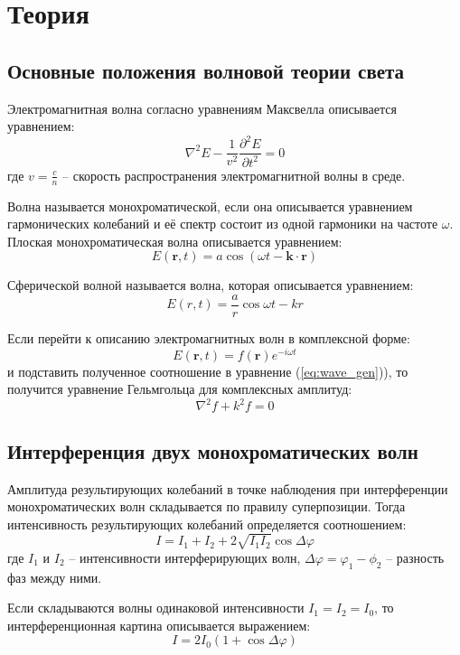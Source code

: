 \section*{Теория}

\subsection*{Основные положения волновой теории света}

Электромагнитная волна согласно уравнениям Максвелла описывается уравнением:
\begin{equation}
\nabla^2 E - \frac{1}{v^2} \frac{\partial^2 E}{\partial t^2} = 0
\label{eq:wave_gen}
\end{equation}
где $v = \frac{c}{n}$ -- скорость распространения электромагнитной волны в 
среде.

Волна называется монохроматической, если она описывается уравнением 
гармонических колебаний и её спектр состоит из одной гармоники на частоте 
$\omega$. Плоская монохроматическая волна описывается уравнением:
$$
E(\boldsymbol{r}, t) = a \cos \left( \omega t - \boldsymbol{k} \cdot 
\boldsymbol{r} \right)
$$

Сферической волной называется волна, которая описывается уравнением:
$$
E(r, t) = \frac{a}{r} \cos{\omega t - k r}
$$

Если перейти к описанию электромагнитных волн в комплексной форме:
$$
E(\boldsymbol{r}, t) = f(\boldsymbol{r}) e^{-i \omega t}
$$
и подставить полученное соотношение в уравнение (\ref{eq:wave_gen})), то 
получится уравнение Гельмгольца для комплексных амплитуд:
$$
\nabla^2 f + k^2 f = 0
$$

\subsection*{Интерференция двух монохроматических волн}

Амплитуда результирующих колебаний в точке наблюдения при интерференции 
монохроматических волн складывается по правилу суперпозиции. Тогда 
интенсивность результирующих колебаний определяется соотношением:
$$
I = I_1 + I_2 + 2 \sqrt{I_1 I_2} \cos \Delta \varphi
$$
где $I_1$ и $I_2$ -- интенсивности интерферирующих волн, $\Delta \varphi = \varphi_1 
- \phi_2$ -- разность фаз между ними.

Если складываются волны одинаковой интенсивности $I_1 = I_2 = I_0$, то 
интерференционная картина описывается выражением:
$$
I = 2 I_0 \left( 1 + \cos \Delta \varphi \right)
$$

